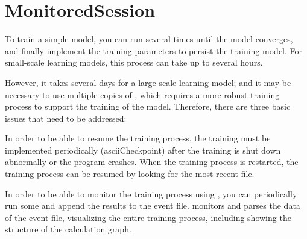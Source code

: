 \begin{savequote}[45mm]
\end{savequote}


\chapter{MonitoredSession} 
\label{ch:monitored-session}
\begin{content}
To train a simple model, you can run  several times until the model converges, and finally implement the training parameters  to persist the training model. For small-scale learning models, this process can take up to several hours.

However, it takes several days for a large-scale learning model; and it may be necessary to use multiple copies of , which requires a more robust training process to support the training of the model. Therefore, there are three basic issues that need to be addressed:

\begin{enum}
\end{enum}

In order to be able to resume the training process, the training must be implemented periodically (ascii{Checkpoint}) after the training is shut down abnormally or the program crashes. When the training process is restarted, the training process can be resumed by looking for the most recent  file.

In order to be able to monitor the training process using , you can periodically run some  and append the results to the event file.  monitors and parses the data of the event file, visualizing the entire training process, including showing the structure of the calculation graph.

\end{content}


